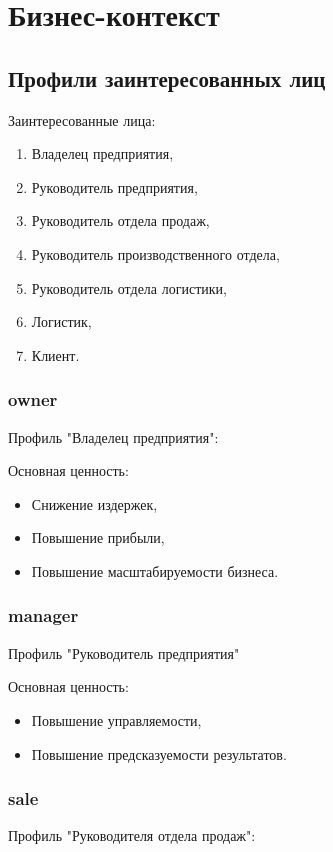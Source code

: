 \chapter{Бизнес-контекст}
\label{ch:chap4}


\section{Профили заинтересованных лиц}
\label{sec:stakeholders}

Заинтересованные лица:
\begin{enumerate}
    \item Владелец предприятия,
    \item Руководитель предприятия,
    \item Руководитель отдела продаж,
    \item Руководитель производственного отдела,
    \item Руководитель отдела логистики,
    \item Логистик,
    \item Клиент.
\end{enumerate}

\subsection{owner}
\label{subsec:owner}
Профиль "Владелец предприятия":

Основная ценность:
\begin{itemize}
    \item Снижение издержек,
    \item Повышение прибыли,
    \item Повышение масштабируемости бизнеса.
\end{itemize}

\subsection{manager}
\label{subsec:manager}
Профиль "Руководитель предприятия"

Основная ценность:
\begin{itemize}
    \item Повышение управляемости,
    \item Повышение предсказуемости результатов.
\end{itemize}

\subsection{sale}
\label{subsec:sale}
Профиль "Руководителя отдела продаж":

